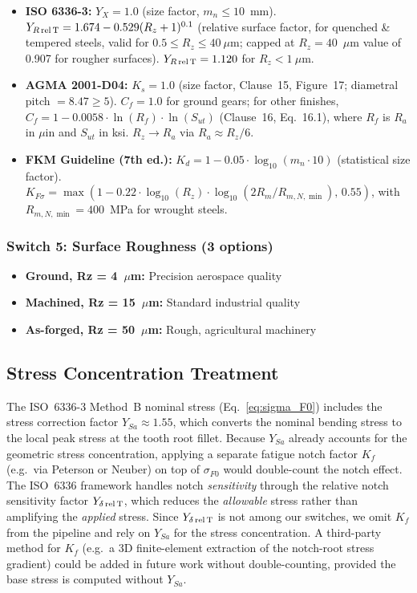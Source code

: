 \documentclass[12pt,a4paper]{article}
\begin{document}
\begin{itemize}
  \item \textbf{ISO 6336-3:} $Y_X = 1.0$ (size factor, $m_n \leq 10$~mm).
        $Y_{R\,\rm rel\,T} = 1.674 - 0.529(R_z+1)^{0.1}$ (relative
        surface factor, for quenched \& tempered steels, valid for
        $0.5 \leq R_z \leq 40~\mu$m; capped at $R_z=40$~$\mu$m value
        of 0.907 for rougher surfaces). $Y_{R\,\rm rel\,T} = 1.120$
        for $R_z < 1~\mu$m.
  \item \textbf{AGMA 2001-D04:} $K_s = 1.0$ (size factor, Clause~15,
        Figure~17; diametral pitch $=8.47 \geq 5$).
        $C_f = 1.0$ for ground gears; for other finishes,
        $C_f = 1 - 0.0058 \cdot \ln(R_f) \cdot \ln(S_{ut})$
        (Clause~16, Eq.~16.1), where $R_f$ is $R_a$ in $\mu$in
        and $S_{ut}$ in ksi. $R_z \rightarrow R_a$ via
        $R_a \approx R_z/6$.
  \item \textbf{FKM Guideline (7th ed.):} $K_d = 1 - 0.05 \cdot
        \log_{10}(m_n \cdot 10)$ (statistical size factor).
        $K_{F\sigma} = \max(1 - 0.22 \cdot \log_{10}(R_z) \cdot
        \log_{10}(2R_m/R_{m,N,\min}),\, 0.55)$, with
        $R_{m,N,\min}=400$~MPa for wrought steels.
\end{itemize}

\subsubsection{Switch 5: Surface Roughness (3 options)}

\begin{itemize}
  \item \textbf{Ground, Rz = 4~$\mu$m:} Precision aerospace quality
  \item \textbf{Machined, Rz = 15~$\mu$m:} Standard industrial quality
  \item \textbf{As-forged, Rz = 50~$\mu$m:} Rough, agricultural machinery
\end{itemize}

\subsection{Stress Concentration Treatment}

The ISO~6336-3 Method~B nominal stress (Eq.~\ref{eq:sigma_F0}) includes
the stress correction factor $Y_{Sa} \approx 1.55$, which converts the
nominal bending stress to the local peak stress at the tooth root
fillet. Because $Y_{Sa}$ already accounts for the geometric stress
concentration, applying a separate fatigue notch factor $K_f$ (e.g.\
via Peterson or Neuber) on top of $\sigma_{F0}$ would double-count the
notch effect. The ISO~6336 framework handles notch \emph{sensitivity}
through the relative notch sensitivity factor $Y_{\delta\,\rm rel\,T}$,
which reduces the \emph{allowable} stress rather than amplifying the
\emph{applied} stress. Since $Y_{\delta\,\rm rel\,T}$ is not among our
switches, we omit $K_f$ from the pipeline and rely on $Y_{Sa}$ for the
stress concentration. A third-party method for $K_f$ (e.g.\ a 3D
finite-element extraction of the notch-root stress gradient) could be
added in future work without double-counting, provided the base stress
is computed without $Y_{Sa}$.
\end{document}
